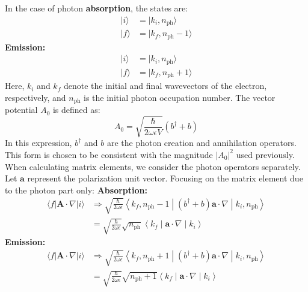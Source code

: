 In the case of photon \textbf{absorption}, the states are:
\begin{align*}
	|i\rangle & = |k_i, n_{\text{ph}} \rangle     \\
	|f\rangle & = |k_f, n_{\text{ph}} - 1 \rangle
\end{align*}
\textbf{Emission:}
\begin{align*}
	|i\rangle & = |k_i, n_{\text{ph}}\rangle     \\
	|f\rangle & = |k_f, n_{\text{ph}} + 1\rangle
\end{align*}
Here, \(k_i\) and \(k_f\) denote the initial and final wavevectors of the electron, respectively, and \(n_{\text{ph}}\) is the initial photon occupation number. The vector potential \(A_0\) is defined as:
\begin{equation}
	A_0 = \sqrt{\frac{\hbar}{2 \omega \epsilon V}} \left(b^\dagger + b\right)
\end{equation}
In this expression, \(b^\dagger\) and \(b\) are the photon creation and annihilation operators. This form is chosen to be consistent with the magnitude \(|A_0|^2\) used previously.\\
When calculating matrix elements, we consider the photon operators separately. Let \( \mathbf{a} \) represent the polarization unit vector. Focusing on the matrix element due to the photon part only:
\textbf{Absorption:}
\begin{align*}
	\langle f | \mathbf{A} \cdot \nabla | i \rangle & \Rightarrow
	\sqrt{\frac{\hbar}{2 \omega \epsilon}} \left\langle k_f, n_{\text{ph}} - 1 \middle| \left(b^\dagger + b\right) \mathbf{a} \cdot \nabla \middle| k_i, n_{\text{ph}} \right\rangle             \\
	                                                & = \sqrt{\frac{\hbar}{2 \omega \epsilon}} \sqrt{n_{\text{ph}}} \left\langle k_f \middle| \mathbf{a} \cdot \nabla \middle| k_i \right\rangle
\end{align*}
\textbf{Emission:}
\begin{align*}
	\langle f | \mathbf{A} \cdot \nabla | i \rangle & \Rightarrow
	\sqrt{\frac{\hbar}{2 \omega \epsilon}} \left\langle k_f, n_{\text{ph}} + 1 \middle| \left(b^\dagger + b\right) \mathbf{a} \cdot \nabla \middle| k_i, n_{\text{ph}} \right\rangle                 \\
	                                                & = \sqrt{\frac{\hbar}{2 \omega \epsilon}} \sqrt{n_{\text{ph}} + 1} \left\langle k_f \middle| \mathbf{a} \cdot \nabla \middle| k_i \right\rangle
\end{align*}
